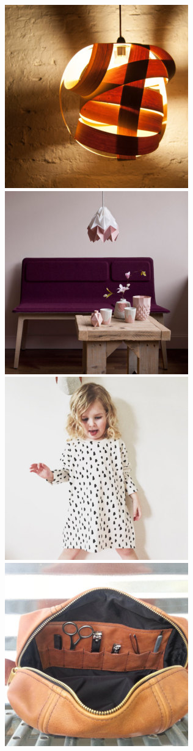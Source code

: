 \documentclass[conference,a4paper]{IEEEtran}
\begin{document}
\begin{figure}
       \includegraphics[scale=0.15]{./figures/sample13.jpg}
     \includegraphics[scale=0.15]{./figures/sample14.jpg}
    \includegraphics[scale=0.15]{./figures/sample15.jpg}
     \includegraphics[scale=0.15]{./figures/sample16.jpg}

\end{figure}
\end{document}
